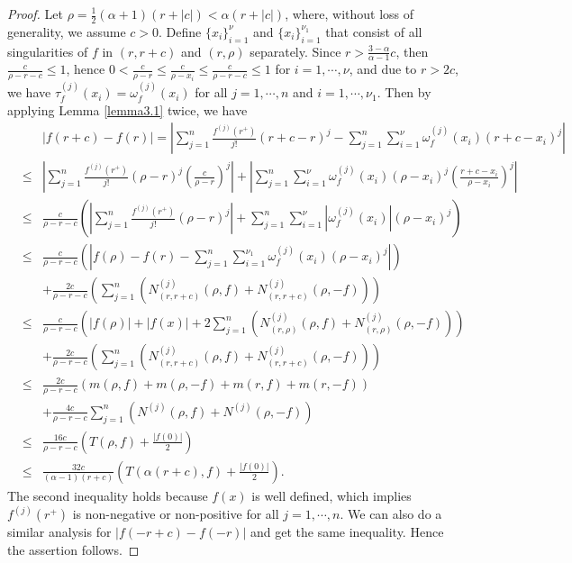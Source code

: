 \documentclass{article}
\begin{document}
\begin{proof}
    Let $\rho=\frac{1}{2}(\alpha+1)(r+|c|)<\alpha(r+|c|)$, where, without loss of generality, we assume $c>0$. Define $\{x_{i}\}_{i=1}^{\nu}$ and $\{x_{i}\}_{i=1}^{\nu_{1}}$ that consist of all singularities of $f$ in $(r, r+c)$ and $(r, \rho)$ separately. Since $r>\frac{3-\alpha}{\alpha-1}c$, then $\frac{c}{\rho-r-c}\leq 1$, hence $0<\frac{c}{\rho-r}\leq\frac{c}{\rho-x_{i}}\leq\frac{c}{\rho-r-c}\leq 1$ for $i=1, \cdots, \nu$, and due to $r>2c$, we have $\tau_{f}^{(j)}(x_{i})=\omega_{f}^{(j)}(x_{i})$ for all $j=1, \cdots, n$ and $i=1, \cdots, \nu_{1}$. Then by applying Lemma \ref{lemma3.1} twice, we have
    \begin{eqnarray*}
        &&|f(r+c)-f(r)|=\left|\sum_{j=1}^{n}\frac{f^{(j)}(r^{+})}{j!}(r+c-r)^{j}-\sum_{j=1}^{n}\sum_{i=1}^{\nu}\omega_{f}^{(j)}(x_{i})(r+c-x_{i})^{j}\right|\\
        &\leq&\left|\sum_{j=1}^{n}\frac{f^{(j)}(r^{+})}{j!}(\rho- r)^{j}\left(\frac{c}{\rho- r}\right)^{j}\right|+\left|\sum_{j=1}^{n}\sum_{i=1}^{\nu}\omega_{f}^{(j)}(x_{i})(\rho-x_{i})^{j}\left(\frac{r+c-x_{i}}{\rho-x_{i}}\right)^{j}\right|\\
        &\leq&\frac{c}{\rho-r-c}\left(\left|\sum_{j=1}^{n}\frac{f^{(j)}(r^{+})}{j!}(\rho-r)^{j}\right|+\sum_{j=1}^{n}\sum_{i=1}^{\nu}|\omega_{f}^{(j)}(x_{i})|(\rho-x_{i})^{j}\right)\\
        &\leq&\frac{c}{\rho-r-c}\left(\left|f(\rho)-f(r)-\sum_{j=1}^{n}\sum_{i=1}^{\nu_{1}}\omega_{f}^{(j)}(x_{i})(\rho-x_{i})^{j}\right|\right)\\
        &&+\frac{2c}{\rho-r-c}\left(\sum_{j=1}^{n}\left(N_{(r, r+c)}^{(j)}(\rho, f)+N_{(r, r+c)}^{(j)}(\rho, -f)\right)\right)\\
        &\leq&\frac{c}{\rho-r-c}\left(|f(\rho)|+|f(x)|+2\sum_{j=1}^{n}\left(N_{(r, \rho)}^{(j)}(\rho, f)+N_{(r, \rho)}^{(j)}(\rho, -f)\right)\right)\\
        &&+\frac{2c}{\rho-r-c}\left(\sum_{j=1}^{n}\left(N_{(r, r+c)}^{(j)}(\rho, f)+N_{(r, r+c)}^{(j)}(\rho, -f)\right)\right)\\
        &\leq&\frac{2c}{\rho-r-c}(m(\rho, f)+m(\rho, -f)+m(r, f)+m(r, -f))\\
        &&+\frac{4c}{\rho-r-c}\sum_{j=1}^{n}\left(N^{(j)}(\rho, f)+N^{(j)}(\rho, -f)\right)\\
        &\leq&\frac{16c}{\rho-r-c}\left(T(\rho, f)+\frac{|f(0)|}{2}\right)\\
        &\leq&\frac{32c}{(\alpha-1)(r+c)}\left(T(\alpha(r+c), f)+\frac{|f(0)|}{2}\right).
    \end{eqnarray*}
    The second inequality holds because $f(x)$ is well defined, which implies $f^{(j)}(r^{+})$ is non-negative or non-positive for all $j=1, \cdots, n$. We can also do a similar analysis for $|f(-r+c)-f(-r)|$ and get the same inequality. Hence the assertion follows.
\end{proof}
\end{document}
